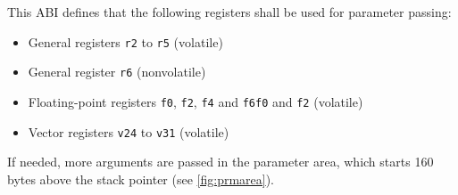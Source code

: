 \documentclass[USenglish,fontsize=11pt,twoside,%
  toc=bib,toc=idx,toc=graduated,numbers=noendperiod,
  bookmarks=true,
  bookmarksnumbered=true,
  bookmarksopen=true,
  bookmarksopenlevel=1,
  breaklinks=true,
  colorlinks=true,
  linkcolor=black,
  pdfpagelayout={TwoPageRight},
  pdfusetitle=true
]{scrreprt}
\newcommand{\STACKSIZE}{160}
\newcommand{\STACKSIZE}{96}
\begin{document}
This ABI defines that the following registers shall be used for parameter
passing:
\begin{itemize}
\item General registers \texttt{r2} to \texttt{r5} (volatile)
\item General register \texttt{r6} (nonvolatile)
\item Floating-point registers {\ifzseries\texttt{f0}, \texttt{f2},
    \texttt{f4} and \texttt{f6}\else \texttt{f0} and \texttt{f2}\fi}
  (volatile)
\item Vector registers \texttt{v24} to \texttt{v31} (volatile)
\end{itemize}
If needed, more arguments are passed in the parameter area, which starts
\STACKSIZE{} bytes above the stack pointer (see \cref{fig:prmarea}).
\end{document}
